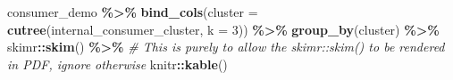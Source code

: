 \documentclass[
]{book}
\newenvironment{Shaded}{\begin{snugshade}}{\end{snugshade}}
\newcommand{\AttributeTok}[1]{\textcolor[rgb]{0.13,0.29,0.53}{#1}}
\newcommand{\CommentTok}[1]{\textcolor[rgb]{0.56,0.35,0.01}{\textit{#1}}}
\newcommand{\DecValTok}[1]{\textcolor[rgb]{0.00,0.00,0.81}{#1}}
\newcommand{\FunctionTok}[1]{\textcolor[rgb]{0.13,0.29,0.53}{\textbf{#1}}}
\newcommand{\NormalTok}[1]{#1}
\newcommand{\SpecialCharTok}[1]{\textcolor[rgb]{0.81,0.36,0.00}{\textbf{#1}}}
\begin{document}
\begin{Shaded}
\begin{Highlighting}[]
\NormalTok{consumer\_demo }\SpecialCharTok{\%\textgreater{}\%}
  \FunctionTok{bind\_cols}\NormalTok{(}\AttributeTok{cluster =} \FunctionTok{cutree}\NormalTok{(internal\_consumer\_cluster, }\AttributeTok{k =} \DecValTok{3}\NormalTok{)) }\SpecialCharTok{\%\textgreater{}\%}
  \FunctionTok{group\_by}\NormalTok{(cluster) }\SpecialCharTok{\%\textgreater{}\%}
\NormalTok{  skimr}\SpecialCharTok{::}\FunctionTok{skim}\NormalTok{() }\SpecialCharTok{\%\textgreater{}\%} 
  \CommentTok{\# This is purely to allow the skimr::skim() to be rendered in PDF, ignore otherwise}
\NormalTok{  knitr}\SpecialCharTok{::}\FunctionTok{kable}\NormalTok{()}
\end{Highlighting}
\end{Shaded}
\end{document}
